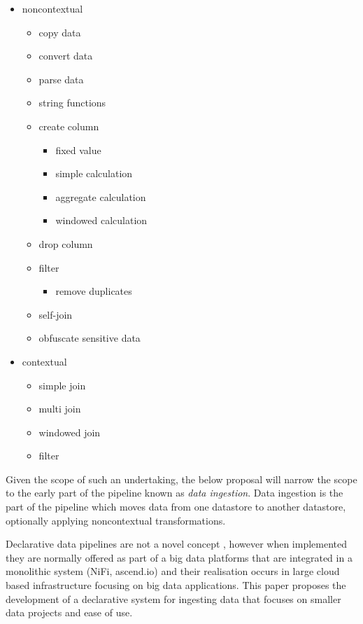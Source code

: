 \begin{itemize}
\tightlist
\item
  noncontextual

  \begin{itemize}
  \tightlist
  \item
    copy data
  \item
    convert data
  \item
    parse data
  \item
    string functions
  \item
    create column

    \begin{itemize}
    \tightlist
    \item
      fixed value
    \item
      simple calculation
    \item
      aggregate calculation
    \item
      windowed calculation
    \end{itemize}
  \item
    drop column
  \item
    filter

    \begin{itemize}
    \tightlist
    \item
      remove duplicates
    \end{itemize}
  \item
    self-join
  \item
    obfuscate sensitive data
  \end{itemize}
\item
  contextual

  \begin{itemize}
  \tightlist
  \item
    simple join
  \item
    multi join
  \item
    windowed join
  \item
    filter
  \end{itemize}
\end{itemize}

Given the scope of such an undertaking, the below proposal will narrow
the scope to the early part of the pipeline known as \emph{data
ingestion}. Data ingestion is the part of the pipeline which moves data
from one datastore to another datastore, optionally applying
noncontextual transformations.

Declarative data pipelines are not a novel concept \citep{ingestbase},
however when implemented they are normally offered as part of a big data
platforms that are integrated in a monolithic system (NiFi, ascend.io)
and their realisation occurs in large cloud based infrastructure
focusing on big data applications. This paper proposes the development
of a declarative system for ingesting data that focuses on smaller data
projects and ease of use.

